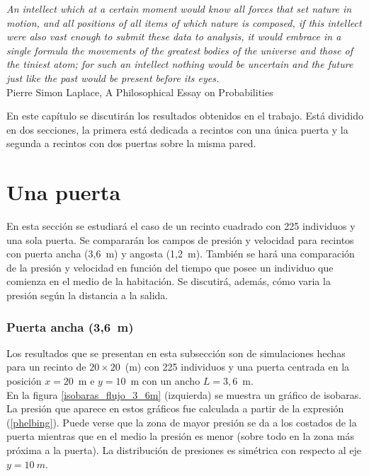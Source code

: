 \label{resultados}

\begin{flushleft}
 {\footnotesize{ \textsl {An intellect which at a certain moment would know all forces that set nature in motion, and all positions of all items of which nature is composed, if this intellect were also vast enough to submit these data to analysis, it would embrace in a single formula the movements of the greatest bodies of the universe and those of the tiniest atom; for such an intellect nothing would be uncertain and the future just like the past would be present before its eyes.}}} \\
\footnotesize  Pierre Simon Laplace, A Philosophical Essay on Probabilities\\
\end{flushleft}

En este capítulo se discutirán los resultados obtenidos en el trabajo. Está dividido en dos secciones, la primera está dedicada a recintos con una única puerta y la segunda a recintos con dos puertas sobre la misma pared.  

\section{\label{una_puerta} Una puerta}

En esta sección se estudiará el caso de un recinto cuadrado con 225 individuos y una sola puerta. Se compararán los campos de presión y velocidad para recintos con puerta ancha (3,6~m) y angosta (1,2~m). También se hará una comparación de la presión y velocidad en función del tiempo que posee un individuo que comienza en el medio de la habitación. Se discutirá, además, cómo varia la presión según la distancia a la salida.     

\subsubsection{Puerta ancha (3,6~m)}

Los resultados que se presentan en esta subsección son de simulaciones hechas para un recinto de  $20\times 20$~(m) con 225 individuos y una puerta centrada en la posición $x=20$~m e $y=10$~m con un ancho $L=3,6$~m.\\

En la figura \ref{isobaras_flujo_3_6m} (izquierda) se muestra un gráfico de isobaras. La presión que aparece en estos gráficos fue calculada a partir de la expresión (\ref{phelbing}). Puede verse que la zona de mayor presión se da a los costados de la puerta mientras que en el medio la presión es menor (sobre todo en la zona más próxima a la puerta). La distribución de presiones es simétrica con respecto al eje $y=10~m$.  

